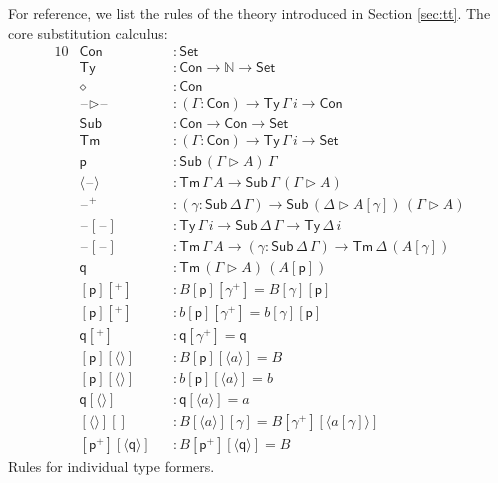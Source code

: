 \documentclass[sigplan,10pt,anonymous,review]{acmart}\settopmatter{printfolios=true,printccs=false,printacmref=false}
\newcommand{\ra}{\rightarrow}
\newcommand{\Set}{\mathsf{Set}}
\newcommand{\Ty}{\mathsf{Ty}}
\newcommand{\Tm}{\mathsf{Tm}}
\newcommand{\Con}{\mathsf{Con}}
\newcommand{\Sub}{\mathsf{Sub}}
\newcommand{\p}{\mathsf{p}}
\newcommand{\q}{\mathsf{q}}
\newcommand{\ext}{\mathop{\triangleright}}
\newcommand{\N}{\mathbb{N}}
\newcommand{\blank}{\mathord{\hspace{1pt}\text{--}\hspace{1pt}}} %
\begin{document}
For reference, we list the rules of the theory introduced in Section
\ref{sec:tt}. The core substitution calculus:
\begin{alignat*}{10}
  & \Con && : \Set \\
  & \Ty && : \Con\ra\N\ra\Set \\
  & \diamond && : \Con \\
  & \blank\ext\blank && : (\Gamma:\Con)\ra\Ty\,\Gamma\,i\ra\Con \\
  & \Sub && : \Con\ra\Con\ra\Set \\
  & \Tm && : (\Gamma:\Con)\ra\Ty\,\Gamma\,i\ra\Set \\
  & \p && : \Sub\,(\Gamma\ext A)\,\Gamma \\
  & \langle\blank\rangle && : \Tm\,\Gamma\,A\ra\Sub\,\Gamma\,(\Gamma\ext A) \\
  & \blank^+ && : (\gamma:\Sub\,\Delta\,\Gamma)\ra\Sub\,(\Delta\ext A[\gamma])\,(\Gamma\ext A) \\
  & \blank[\blank] && : \Ty\,\Gamma\,i\ra\Sub\,\Delta\,\Gamma\ra\Ty\,\Delta\,i \\
  & \blank[\blank] && : \Tm\,\Gamma\,A\ra(\gamma:\Sub\,\Delta\,\Gamma)\ra\Tm\,\Delta\,(A[\gamma]) \\
  & \q && : \Tm\,(\Gamma\ext A)\,(A[\p]) \\
  & [\p][^+] && : B[\p][\gamma^+] = B[\gamma][\p] \\
  & [\p][^+] && : b[\p][\gamma^+] = b[\gamma][\p] \\
  & \q[^+] && : \q[\gamma^+] = \q \\
  & [\p][\langle\rangle] && : B[\p][\langle a\rangle] = B \\
  & [\p][\langle\rangle] && : b[\p ][\langle a\rangle] = b \\
  & \q[\langle\rangle] && : \q[\langle a\rangle] = a \\
  & [\langle\rangle][] && : B[\langle a\rangle][\gamma] = B[\gamma^+][\langle a[\gamma]\rangle] \\
  & [\p^+][\langle\q\rangle] && : B[\p^+][\langle\q\rangle] = B
\end{alignat*}
Rules for individual type formers.
\end{document}
